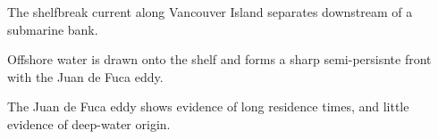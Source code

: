 \documentclass[draft]{agujournal2019}
\begin{document}

\begin{keypoints}
\item The shelfbreak current along Vancouver Island separates downstream of a submarine bank.
\item Offshore water is drawn onto the shelf and forms a sharp semi-persisnte front with the Juan de Fuca eddy.
\item The Juan de Fuca eddy shows evidence of long residence times, and little evidence of deep-water origin.
\end{keypoints}

%
%

%
%

\end{document}
